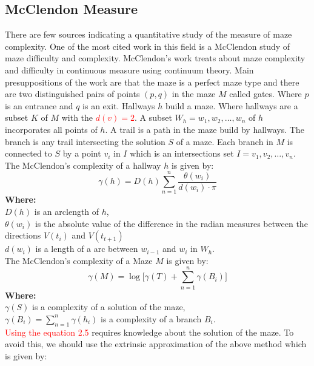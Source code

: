 \subsection{McClendon Measure}
There are few sources indicating a quantitative study of the measure of maze complexity. One of the most cited work in this field is a McClendon \textcolor{red}{\cite{McClendon}} study of maze difficulty and complexity. 
McClendon’s work treats about maze complexity and difficulty in continuous measure using continuum theory. Main presuppositions of the work are that the maze is a perfect maze type and there are two distinguished pairs of points $(p,q)$ in the maze $M$ called gates. Where $p$ is an entrance and $q$ is an exit.  Hallways  $h$ build a maze. 
Where hallways are a subset $K$ of $M$ with the \textcolor{red}{$d(v) = 2$}. A subset $W_h = {w_1,w_2,\ldots, w_n}$ of $h$ incorporates all points of $h$. 
A trail is a path in the maze build by hallways. The branch is any trail intersecting the solution $S$ of a maze. Each branch in $M$ is connected to $S$ by a point $v_i$ in $I$ which is an intersections set $I = {v_1,v_2,\dots, v_n}$. The McClendon’s complexity of a hallway $h$ is given by:\\
\begin{equation}
\gamma(h) = D(h)\sum_{n = 1}^{n} \frac{\theta(w_i)}{d(w_i)\cdot \pi}
\end{equation}
\textbf{Where:}\\
$D(h)$ is an arclength of $h$,\\ 
$\theta(w_i)$ is the absolute value of the difference in the radian measures between the directions $V(t_i)$ and $V(t_{t+1})$\\ 
$d(w_i)$ is a length of a arc between $w_{i-1}$ and $w_i$ in $W_h$.\\ 
\newline
The McClendon’s complexity of a Maze $M$ is given by:\\
\begin{equation}
\gamma(M)=\log\bigl[\gamma(T) + \sum_{n = 1}^{n} \gamma(B_i) \bigr]
\end{equation}
\textbf{Where:}\\
$\gamma(S)$ is a complexity of a solution of the maze,\\
$\gamma(B_i) = \sum_{n = 1}^{n} \gamma(h_i)$ is a complexity of a branch $B_i$.\\
\newline 
\textcolor{red}{Using the equation 2.5 } requires knowledge about the solution of the maze. To avoid this, we should use the extrinsic approximation of the above method which is given by:\\
